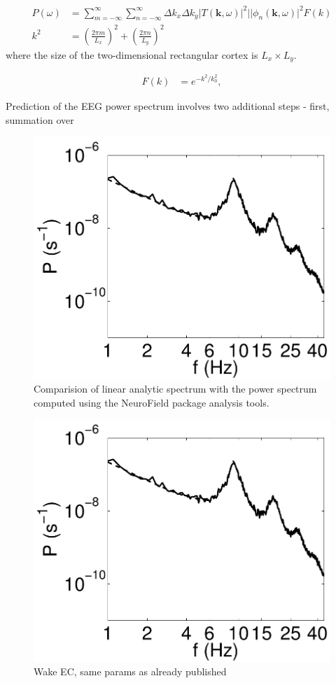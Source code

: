 \documentclass[preprint,review,10pt,authoryear,letterpaper]{elsarticle}
\begin{document}
\begin{align}
\label{eqn:power_sum}
P(\omega) &= \sum_{m = -\infty}^{\infty}\sum_{n = -\infty}^{\infty} \Delta k_x \Delta k_y |T(\mathbf{k},\omega)|^2||\phi_n(\mathbf{k},\omega)|^2F(k)\\
k^2 &=  \left( \frac{2\pi m}{L_x} \right)^2 + \left( \frac{2\pi n}{L_y}\right)^2 
\end{align}
where the size of the two-dimensional rectangular cortex is $L_x \times L_y$. 

\begin{align}
F(k) &= e^{-k^2/k_0^2},
\end{align}


Prediction of the EEG power spectrum involves two additional steps - first, summation over 

\begin{figure}[!b]
\begin{center}
\includegraphics[width=0.80\columnwidth]{corticothalamic_comparison}
\caption{Comparision of linear analytic spectrum with the power spectrum computed using the NeuroField package analysis tools.}
\label{fig:ct_spectrum}
\end{center}
\end{figure}

\begin{figure}[!b]
\begin{center}
\includegraphics[width=0.80\columnwidth]{corticothalamic_comparison}
\caption{Wake EC, same params as already published}
\label{fig:ct_spectrum_1}
\end{center}
\end{figure}
\end{document}
